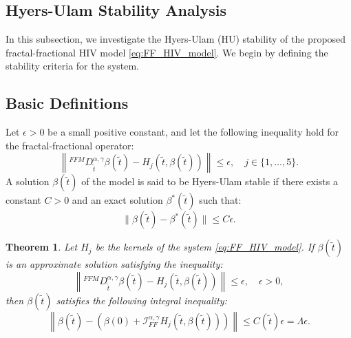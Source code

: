 \documentclass[10pt,a4paper]{amsart}
\newtheorem{theorem}{Theorem}[section]
\numberwithin{equation}{section}
\begin{document}
\subsection{Hyers-Ulam Stability Analysis}
In this subsection, we investigate the Hyers-Ulam (HU) stability of the proposed fractal-fractional HIV model \eqref{eq:FF_HIV_model}. We begin by defining the stability criteria for the system.
\subsection{Basic Definitions}
Let $\epsilon > 0$ be a small positive constant, and let the following inequality hold for the fractal-fractional operator:
\begin{equation}
	\left\| {}^{FFM}D_{\tilde{t}}^{\alpha,\gamma} \beta(\tilde{t}) - H_j(\tilde{t}, \beta(\tilde{t})) \right\| \leq \epsilon, \quad j \in \{1, \dots, 5\}.
\end{equation}
A solution $\beta(\tilde{t})$ of the model is said to be Hyers-Ulam stable if there exists a constant $C > 0$ and an exact solution $\beta^*(\tilde{t})$ such that:
\begin{equation}
	\|\beta(\tilde{t}) - \beta^*(\tilde{t})\| \leq C \epsilon.
\end{equation}

\begin{theorem}\label{thm:6.1}
Let $H_j$ be the kernels of the system \eqref{eq:FF_HIV_model}. If $\beta(\tilde{t})$ is an approximate solution satisfying the inequality:
\begin{equation}
    \left\| {}^{FFM}D_{\tilde{t}}^{\alpha,\gamma} \beta
    (\tilde{t}) - H_j(\tilde{t}, \beta(\tilde{t})) \right\| \leq \epsilon, \quad \epsilon > 0,
\end{equation}
then $\beta(\tilde{t})$ satisfies the following integral inequality:
\begin{equation}
    \left\| \beta(\tilde{t}) - \left( \beta(0) + \mathcal{I}_{FF}^{\alpha, \gamma} H_j(\tilde{t}, \beta(\tilde{t})) \right) \right\| \leq C(\tilde{t}) \epsilon = \Lambda \epsilon.
\end{equation}
\end{theorem}
\end{document}
